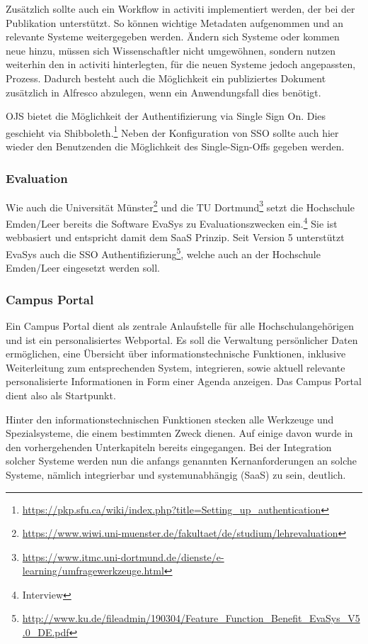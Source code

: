 {{Zusätzlich sollte auch ein Workflow in activiti implementiert werden, der bei der Publikation unterstützt. So können wichtige Metadaten aufgenommen und an relevante Systeme weitergegeben werden. Ändern sich Systeme oder kommen neue hinzu, müssen sich Wissenschaftler nicht umgewöhnen, sondern nutzen weiterhin den in activiti hinterlegten, für die neuen Systeme jedoch angepassten, Prozess. Dadurch besteht auch die Möglichkeit ein publiziertes Dokument zusätzlich in Alfresco abzulegen, wenn ein Anwendungsfall dies benötigt.

OJS bietet die Möglichkeit der Authentifizierung via Single Sign On. Dies geschieht via Shibboleth.\footnote{\url{https://pkp.sfu.ca/wiki/index.php?title=Setting_up_authentication}} Neben der Konfiguration von SSO sollte auch hier wieder den Benutzenden die Möglichkeit des Single-Sign-Offs gegeben werden.

\subsubsection{Evaluation}
Wie auch die Universität Münster\footnote{\url{https://www.wiwi.uni-muenster.de/fakultaet/de/studium/lehrevaluation}} und die TU Dortmund\footnote{\url{https://www.itmc.uni-dortmund.de/dienste/e-learning/umfragewerkzeuge.html}} setzt die Hochschule Emden/Leer bereits die Software EvaSys zu Evaluationszwecken ein.\footnote{Interview} Sie ist webbasiert und entspricht damit dem SaaS Prinzip.
Seit Version 5 unterstützt EvaSys auch die SSO Authentifizierung\footnote{\url{http://www.ku.de/fileadmin/190304/Feature_Function_Benefit_EvaSys_V5.0_DE.pdf}}, welche auch an der Hochschule Emden/Leer eingesetzt werden soll.

\subsubsection{Campus Portal}
\label{subsubsection_campus_portal}
Ein Campus Portal dient als zentrale Anlaufstelle für alle Hochschulangehörigen und ist ein personalisiertes Webportal. Es soll die Verwaltung persönlicher Daten ermöglichen, eine Übersicht über informationstechnische Funktionen, inklusive Weiterleitung zum entsprechenden System, integrieren, sowie aktuell relevante personalisierte Informationen in Form einer Agenda anzeigen. Das Campus Portal dient also als Startpunkt.

Hinter den informationstechnischen Funktionen stecken alle Werkzeuge und Spezialsysteme, die einem bestimmten Zweck dienen. Auf einige davon wurde in den vorhergehenden Unterkapiteln bereits eingegangen. Bei der Integration solcher Systeme werden nun die anfangs genannten Kernanforderungen an solche Systeme, nämlich integrierbar und systemunabhängig (SaaS) zu sein, deutlich.

}}
